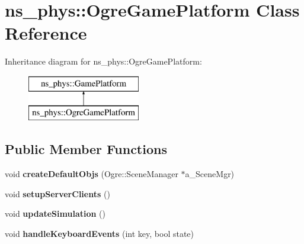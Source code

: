 \hypertarget{classns__phys_1_1_ogre_game_platform}{}\section{ns\+\_\+phys\+:\+:Ogre\+Game\+Platform Class Reference}
\label{classns__phys_1_1_ogre_game_platform}
Inheritance diagram for ns\+\_\+phys\+:\+:Ogre\+Game\+Platform\+:\begin{figure}[H]
\begin{center}
\leavevmode
\includegraphics[height=2.000000cm]{classns__phys_1_1_ogre_game_platform}
\end{center}
\end{figure}
\subsection*{Public Member Functions}
\begin{DoxyCompactItemize}
\item 
void {\bfseries create\+Default\+Objs} (Ogre\+::\+Scene\+Manager $\ast$a\+\_\+\+Scene\+Mgr)\hypertarget{classns__phys_1_1_ogre_game_platform_a327ff82ad4ceaa857dc6362915f17635}{}\label{classns__phys_1_1_ogre_game_platform_a327ff82ad4ceaa857dc6362915f17635}

\item 
void {\bfseries setup\+Server\+Clients} ()\hypertarget{classns__phys_1_1_ogre_game_platform_a9995c1c1c7d8827f7c57e2810848274c}{}\label{classns__phys_1_1_ogre_game_platform_a9995c1c1c7d8827f7c57e2810848274c}

\item 
void {\bfseries update\+Simulation} ()\hypertarget{classns__phys_1_1_ogre_game_platform_a0913cef8496005013aa409c0938cfc2c}{}\label{classns__phys_1_1_ogre_game_platform_a0913cef8496005013aa409c0938cfc2c}

\item 
void {\bfseries handle\+Keyboard\+Events} (int key, bool state)\hypertarget{classns__phys_1_1_ogre_game_platform_a6a50214f8d8038d25c78c29008d62664}{}\label{classns__phys_1_1_ogre_game_platform_a6a50214f8d8038d25c78c29008d62664}

\end{DoxyCompactItemize}
